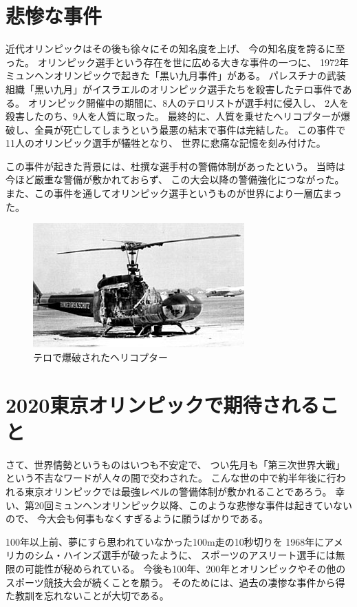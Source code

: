 \documentclass[]{jsarticle}
\begin{document}
\section{悲惨な事件}
近代オリンピックはその後も徐々にその知名度を上げ、
今の知名度を誇るに至った。
オリンピック選手という存在を世に広める大きな事件の一つに、
1972年ミュンヘンオリンピックで起きた「黒い九月事件」がある。
パレスチナの武装組織「黒い九月」がイスラエルのオリンピック選手たちを殺害したテロ事件である。
オリンピック開催中の期間に、8人のテロリストが選手村に侵入し、
2人を殺害したのち、9人を人質に取った。
最終的に、人質を乗せたヘリコプターが爆破し、全員が死亡してしまうという最悪の結末で事件は完結した。
この事件で11人のオリンピック選手が犠牲となり、
世界に悲痛な記憶を刻み付けた。

この事件が起きた背景には、杜撰な選手村の警備体制があったという。
当時は今ほど厳重な警備が敷かれておらず、
この大会以降の警備強化につながった。
また、この事件を通してオリンピック選手というものが世界により一層広まった。

\begin{figure}[h]
    \centering
    \includegraphics{heli.jpg}
    \caption{テロで爆破されたヘリコプター}
\end{figure}

\section{2020東京オリンピックで期待されること}
さて、世界情勢というものはいつも不安定で、
つい先月も「第三次世界大戦」という不吉なワードが人々の間で交わされた。
こんな世の中で約半年後に行われる東京オリンピックでは最強レベルの警備体制が敷かれることであろう。
幸い、第20回ミュンヘンオリンピック以降、このような悲惨な事件は起きていないので、
今大会も何事もなくすぎるように願うばかりである。

100年以上前、夢にすら思われていなかった100m走の10秒切りを
1968年にアメリカのシム・ハインズ選手が破ったように、
スポーツのアスリート選手には無限の可能性が秘められている。
今後も100年、200年とオリンピックやその他のスポーツ競技大会が続くことを願う。
そのためには、過去の凄惨な事件から得た教訓を忘れないことが大切である。
\end{document}
